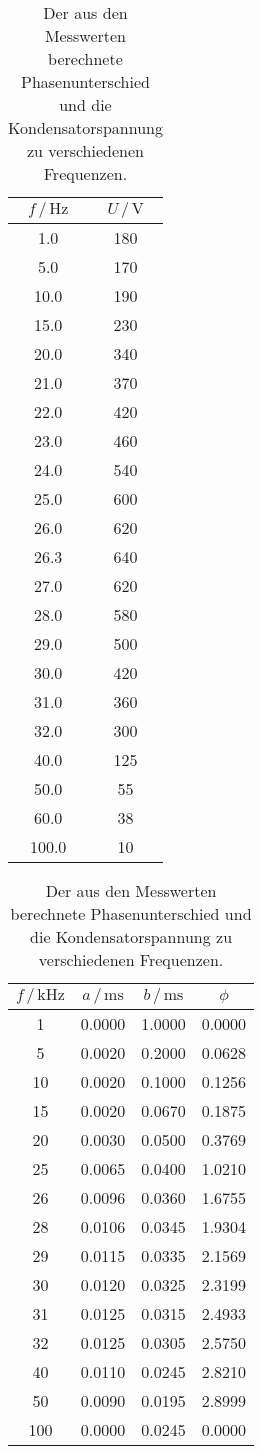 \begin{table}
\centering
\caption{Der aus den Messwerten berechnete Phasenunterschied und die Kondensatorspannung zu verschiedenen Frequenzen.}
\begin{tabular}[t]{cc|}
    \toprule
    $f \, / \, \si{\hertz}$ & $U \, / \, \si{\V}$\\
    \midrule
    1.0& 180    \\
    5.0& 170\\
    10.0& 190\\
    15.0& 230\\
    20.0& 340\\
    21.0& 370\\
    22.0& 420\\
    23.0& 460\\
    24.0& 540\\
    25.0& 600\\
    26.0& 620\\
    26.3& 640\\
    27.0& 620\\
    28.0& 580\\
    29.0& 500\\
    30.0& 420\\
    31.0& 360\\
    32.0& 300\\
    40.0& 125\\
    50.0& 55\\
    60.0& 38\\
    100.0& 10\\
    \bottomrule
\end{tabular}
\begin{tabular}[t]{|cccc}
    \toprule
    $f \,/\, \si{\kilo\hertz}$ & $a \,/\, \si{\milli\second}$ &  $b \,/\, \si{\milli\second}$ & $\phi$\\
    \midrule
    1& 0.0000& 1.0000& 0.0000\\
    5& 0.0020& 0.2000& 0.0628\\
    10& 0.0020& 0.1000&  0.1256\\
    15& 0.0020& 0.0670& 0.1875 \\
    20& 0.0030& 0.0500&  0.3769\\
    25& 0.0065& 0.0400&  1.0210\\
    26& 0.0096& 0.0360&  1.6755\\
    28& 0.0106& 0.0345& 1.9304 \\
    29& 0.0115& 0.0335& 2.1569\\
    30& 0.0120& 0.0325&  2.3199\\
    31& 0.0125& 0.0315 & 2.4933\\
    32& 0.0125& 0.0305& 2.5750\\
    40& 0.0110& 0.0245& 2.8210\\
    50& 0.0090& 0.0195& 2.8999\\
    100&0.0000& 0.0245& 0.0000\\
    \bottomrule
\end{tabular}
\label{tab:phase}
\end{table}
